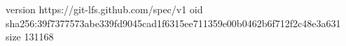 version https://git-lfs.github.com/spec/v1
oid sha256:39f7377573abe339fd9045cad1f6315ee711359e00b0462b6f712f2c48e3a631
size 131168

